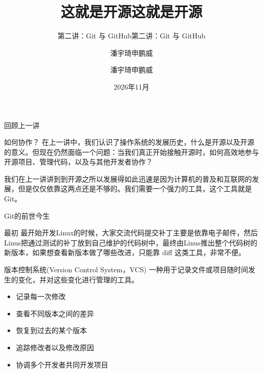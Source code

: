 \documentclass[aspectratio=169]{beamer}
\title{这就是开源}
\subtitle{第二讲：Git 与 GitHub}
\author{潘宇琦\hspace*{1em}申鹏威}
\begin{document}
\begin{frame}
	\title{这就是开源}
	\subtitle{第二讲：Git 与 GitHub}
	\author{潘宇琦\hspace*{1em}申鹏威}
	\date{2026年11月}
	\titlepage
\end{frame}	
	
\begin{frame}{回顾上一讲}
\begin{block}{如何协作？}
	\hspace*{2em}在上一讲中，我们认识了操作系统的发展历史，什么是开源以及开源的意义。但现在仍然面临一个问题：当我们真正开始接触开源时，如何高效地参与开源项目、管理代码，以及与其他开发者协作？
	
	\hspace*{2em}我们在上一讲讲到到开源之所以发展得如此迅速是因为计算机的普及和互联网的发展，但是仅仅依靠这两点还是不够的。我们需要一个强力的工具，这个工具就是Git。
\end{block}
\end{frame}	

\begin{frame}{Git的前世今生}
\begin{block}{最初}
	\hspace*{2em}最开始开发Linux的时候，大家交流代码提交补丁主要是依靠电子邮件，然后Linus把通过测试的补丁放到自己维护的代码树中，最终由Linus推出整个代码树的新版本，如果想查看新版本做了哪些改进，只能靠 diff 这类工具，非常不便。
\end{block}
\begin{block}{版本控制系统(Version Control System，VCS)}
	\hspace*{2em}一种用于记录文件或项目随时间发生的变化，并对这些变化进行管理的工具。
	\begin{itemize}
		\item 记录每一次修改
		\item 查看不同版本之间的差异
		\item 恢复到过去的某个版本
		\item 追踪修改者以及修改原因
		\item 协调多个开发者共同开发项目
	\end{itemize}
\end{block}
\end{frame}
\end{document}
